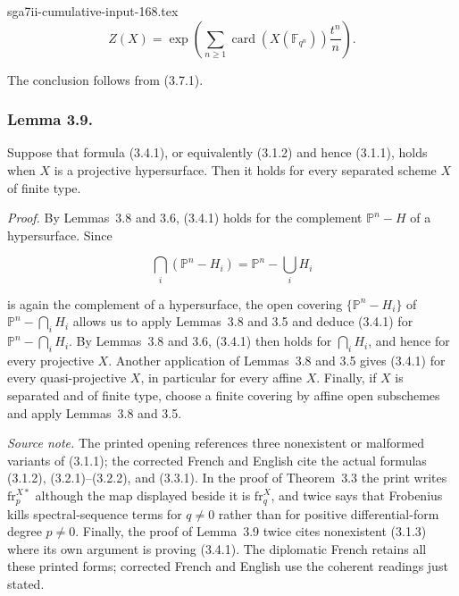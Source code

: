\begin{filecontents*}{sga7ii-cumulative-input-168.tex}
\begin{equation}\tag{3.8.3}
Z(X)=\exp\!\left(
\sum_{n\geq1}\operatorname{card}(X(\mathbb F_{q^n}))\frac{t^n}{n}
\right).
\end{equation}

The conclusion follows from (3.7.1).

\subsubsection*{Lemma 3.9.}
Suppose that formula (3.4.1), or equivalently (3.1.2) and hence (3.1.1), holds
when $X$ is a projective hypersurface. Then it holds for every separated
scheme $X$ of finite type.

\medskip
\noindent\emph{Proof.}
By Lemmas~3.8 and 3.6, (3.4.1) holds for the complement
$\mathbb P^n-H$ of a hypersurface. Since

\[
\bigcap_i(\mathbb P^n-H_i)=\mathbb P^n-\bigcup_iH_i
\]

is again the complement of a hypersurface, the open covering
$\{\mathbb P^n-H_i\}$ of $\mathbb P^n-\bigcap_iH_i$ allows us to apply
Lemmas~3.8 and 3.5 and deduce (3.4.1) for
$\mathbb P^n-\bigcap_iH_i$. By Lemmas~3.8 and 3.6, (3.4.1) then holds for
$\bigcap_iH_i$, and hence for every projective $X$. Another application of
Lemmas~3.8 and 3.5 gives (3.4.1) for every quasi-projective $X$, in particular
for every affine $X$. Finally, if $X$ is separated and of finite type, choose
a finite covering by affine open subschemes and apply Lemmas~3.8 and 3.5.

\medskip
\noindent\emph{Source note.}
The printed opening references three nonexistent or malformed variants of
(3.1.1); the corrected French and English cite the actual formulas (3.1.2),
(3.2.1)--(3.2.2), and (3.3.1). In the proof of Theorem~3.3 the print writes
$\mathrm{fr}_p^{X*}$ although the map displayed beside it is
$\mathrm{fr}_q^X$, and twice says that Frobenius kills spectral-sequence terms
for $q\ne0$ rather than for positive differential-form degree $p\ne0$.
Finally, the proof of Lemma~3.9 twice cites nonexistent (3.1.3) where its own
argument is proving (3.4.1). The diplomatic French retains all these printed
forms; corrected French and English use the coherent readings just stated.
\end{filecontents*}
